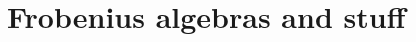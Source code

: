 \documentclass[../../../deep-dive]{subfiles}
\begin{document}
\chapter{Frobenius algebras and stuff}
\end{document}
